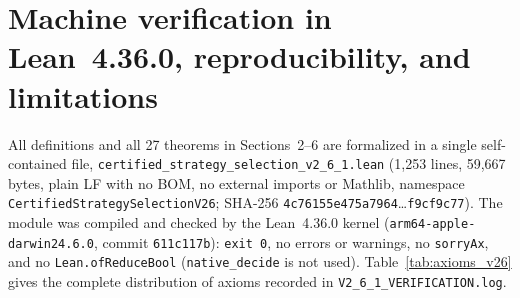 \documentclass[11pt,a4paper]{article}
\theoremstyle{cleanthm}
\DeclareRobustCommand{\id}[1]{\allowbreak\nolinkurl{#1}\allowbreak}
\begin{document}
\section{Machine verification in Lean~4.36.0, reproducibility, and limitations}

All definitions and all 27 theorems in Sections~2--6 are formalized in a single self-contained file, \id{certified_strategy_selection_v2_6_1.lean} (1,253 lines, 59,667 bytes, plain LF with no BOM, no external imports or Mathlib, namespace \id{CertifiedStrategySelectionV26}; SHA-256 \id{4c76155e475a7964}\ldots\id{f9cf9c77}). The module was compiled and checked by the Lean~4.36.0 kernel (\id{arm64-apple-darwin24.6.0}, commit \id{611c117b}): \id{exit 0}, no errors or warnings, no \id{sorryAx}, and no \id{Lean.ofReduceBool} (\id{native_decide} is not used). Table~\ref{tab:axioms_v26} gives the complete distribution of axioms recorded in \id{V2_6_1_VERIFICATION.log}.
\end{document}
